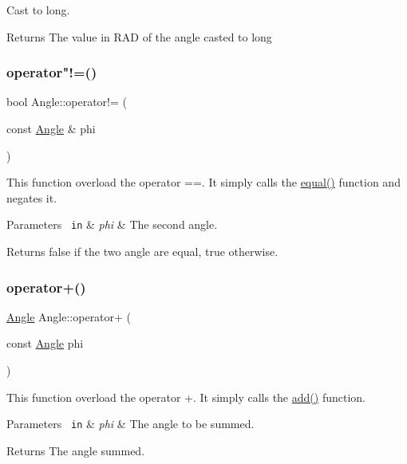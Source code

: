 Cast to long. 

\begin{DoxyReturn}{Returns}
The value in R\+AD of the angle casted to long 
\end{DoxyReturn}
\mbox{\label{class_angle_a8d22835be41b628a5216243b7f7e50a1}} 
\subsubsection{\texorpdfstring{operator"!=()}{operator!=()}}
{\footnotesize\ttfamily bool Angle\+::operator!= (\begin{DoxyParamCaption}\item[{const \mbox{\hyperlink{class_angle}{Angle}} \&}]{phi }\end{DoxyParamCaption})\hspace{0.3cm}{\ttfamily [inline]}}

This function overload the operator ==. It simply calls the {\ttfamily \mbox{\hyperlink{class_angle_a56b3dfe127d0abc16db14bd22ed4b5b4}{equal()}}} function and negates it. 
\begin{DoxyParams}[1]{Parameters}
\mbox{\texttt{ in}}  & {\em phi} & The second angle. \\
\hline
\end{DoxyParams}
\begin{DoxyReturn}{Returns}
{\ttfamily false} if the two angle are equal, {\ttfamily true} otherwise. 
\end{DoxyReturn}
\mbox{\label{class_angle_aa04bc36c641e1ecfb7aee5019ed8e6ea}} 
\subsubsection{\texorpdfstring{operator+()}{operator+()}}
{\footnotesize\ttfamily \mbox{\hyperlink{class_angle}{Angle}} Angle\+::operator+ (\begin{DoxyParamCaption}\item[{const \mbox{\hyperlink{class_angle}{Angle}}}]{phi }\end{DoxyParamCaption})\hspace{0.3cm}{\ttfamily [inline]}}

This function overload the operator +. It simply calls the {\ttfamily \mbox{\hyperlink{class_angle_ab7279e3fb4ab12c334153f992ede0f1c}{add()}}} function. 
\begin{DoxyParams}[1]{Parameters}
\mbox{\texttt{ in}}  & {\em phi} & The angle to be summed. \\
\hline
\end{DoxyParams}
\begin{DoxyReturn}{Returns}
The angle summed. 
\end{DoxyReturn}
\mbox{\label{class_angle_a8129646ed5390b538ccf7c19f9213967}} 
